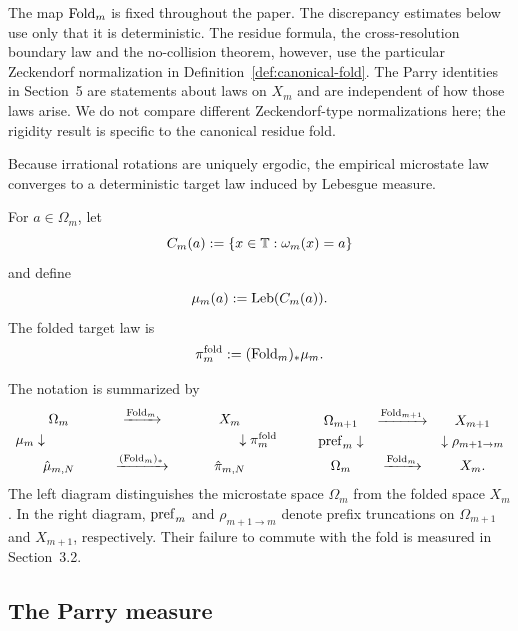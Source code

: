 \begin{remark}\label{rem:scope-fold-assumptions}
The map \(\mathrm{Fold}_m\) is fixed throughout the paper.  The discrepancy estimates
below use only that it is deterministic.  The residue formula, the
cross-resolution boundary law and the no-collision theorem, however, use the
particular Zeckendorf normalization in Definition~\ref{def:canonical-fold}.
The Parry identities in Section~5 are statements about laws on \(X_m\) and are
independent of how those laws arise.  We do not compare different
Zeckendorf-type normalizations here; the rigidity result is specific to the
canonical residue fold.
\end{remark}

Because irrational rotations are uniquely ergodic, the empirical microstate
law converges to a deterministic target law induced by Lebesgue measure.

\begin{definition}\label{def:target-laws}
For \(a\in\Omega_m\), let
\[
C_m(a):=\{x\in\mathbb{T}:\omega_m(x)=a\}
\]
and define
\[
\mu_m(a):=\mathrm{Leb}(C_m(a)).
\]
The folded target law is
\[
\pi_m^{\mathrm{fold}}:=(\mathrm{Fold}_m)_*\mu_m.
\]
\end{definition}

\begin{remark}\label{rem:model-spaces-maps}
The notation is summarized by
\[
\begin{array}{ccc}
\Omega_m & \xrightarrow{\Fold_m} & X_m\\[0.3em]
\mu_m \downarrow\phantom{(\Fold_m)_*} &  & \phantom{(\Fold_m)_*}\downarrow \pi_m^{\mathrm{fold}}\\[0.3em]
\hat\mu_{m,N} & \xrightarrow{(\Fold_m)_*} & \hat\pi_{m,N}
\end{array}
\qquad
\begin{array}{ccc}
\Omega_{m+1} & \xrightarrow{\Fold_{m+1}} & X_{m+1}\\[0.3em]
\pref_m \downarrow &  & \downarrow \rho_{m+1\to m}\\[0.3em]
\Omega_m & \xrightarrow{\Fold_m} & X_m.
\end{array}
\]
The left diagram distinguishes the microstate space \(\Omega_m\) from the
folded space \(X_m\).  In the right diagram, \(\mathrm{pref}_m\) and
\(\rho_{m+1\to m}\) denote prefix truncations on \(\Omega_{m+1}\) and
\(X_{m+1}\), respectively.  Their failure to commute with the fold is measured
in Section~3.2.
\end{remark}

\subsection{The Parry measure}


